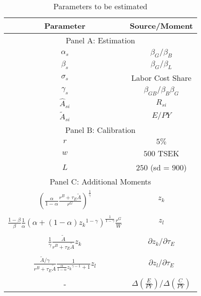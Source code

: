\begin{table}[http]
    \centering
    \caption{\quad Parameters to be estimated} \label{tab:estimate_parameters}
    \vspace*{2mm}
    \begin{tabular}{@{}cc@{}}
    \toprule
    \textbf{Parameter}  & \textbf{Source/Moment}\\
    \midrule 
    \multicolumn{2}{c}{Panel A: Estimation} \\
    \midrule
    $\alpha_s$ & ${\beta_G}/{\beta_B}$ \\
    $\beta_s$ & ${\beta_G}/{\beta_L}$\\ 
    $\sigma_s$ & Labor Cost Share\\
    $\gamma_s$ & ${\beta_{GB}}/{\beta_B\beta_G}$\\
    $\hat{A}_{si}$ & $R_{si}$\\
    $\tilde{A}_{si}$ & $E/PY$\\
    \midrule
    \multicolumn{2}{c}{Panel B: Calibration} \\
    \midrule
    $r$ & $5\%$  \\
    $w$ & $500$ TSEK  \\
    $L$ & $250$ (sd = $900$) \cite{martinsson2024effect}  \\
    \midrule
    \multicolumn{2}{c}{Panel C: Additional Moments} \\
    \midrule
    $ \left(
            \frac{\alpha}{1-\alpha} \frac{r^B + {\tau_E}\tilde{A}}{r^G}
        \right) ^{\frac{1}{\gamma}}$ & $z_k$ \\\\
    $\frac{1-\beta}{\beta}\frac{1}{\alpha}\left(
        \alpha + (1-\alpha) {{z_k}}^{1-\gamma}
    \right)^{\frac{1}{1-\gamma}} \frac{r^G}{W}$ & $z_l$ \\\\
    $\frac{1}{\gamma} \frac{\tilde{A}}{r^B + \tau_E\tilde{A}} z_k$ & ${\partial z_k/\partial \tau_E }$ \\\\
    $\frac{\tilde{A}/\gamma}{r^B + \tau_E\tilde{A}}\frac{1}{\frac{\alpha}{1-\alpha}{{z_k}}^{\gamma-1} + 1}{z_l}$ &   $\partial z_l/\partial \tau_E$\\\\
    - & $\Delta(\frac{E}{PY})/\Delta(\frac{C}{PY}) $ \\
    \bottomrule
\end{tabular}
\end{table}





